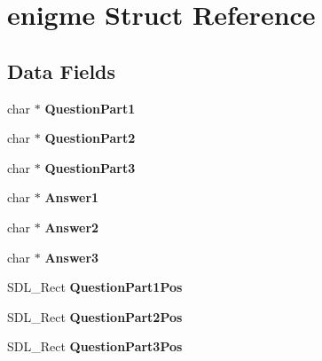 \hypertarget{structenigme}{}\section{enigme Struct Reference}
\label{structenigme}
\subsection*{Data Fields}
\begin{DoxyCompactItemize}
\item 
char $\ast$ {\bfseries Question\+Part1}\hypertarget{structenigme_aeb07dbe65787c22652fabf2f65391410}{}\label{structenigme_aeb07dbe65787c22652fabf2f65391410}

\item 
char $\ast$ {\bfseries Question\+Part2}\hypertarget{structenigme_ae9a41834f23ba4c4b781069af3e4d662}{}\label{structenigme_ae9a41834f23ba4c4b781069af3e4d662}

\item 
char $\ast$ {\bfseries Question\+Part3}\hypertarget{structenigme_a261a8372dd77f3d5a5940f09d37f48fa}{}\label{structenigme_a261a8372dd77f3d5a5940f09d37f48fa}

\item 
char $\ast$ {\bfseries Answer1}\hypertarget{structenigme_a3eb3c7d9cd0ff72dbd314c47f13360f9}{}\label{structenigme_a3eb3c7d9cd0ff72dbd314c47f13360f9}

\item 
char $\ast$ {\bfseries Answer2}\hypertarget{structenigme_a4f8e5449f4c8daa89c71a4a957b8e3be}{}\label{structenigme_a4f8e5449f4c8daa89c71a4a957b8e3be}

\item 
char $\ast$ {\bfseries Answer3}\hypertarget{structenigme_ade34f56bb419a9d94370a4c7a6bc2771}{}\label{structenigme_ade34f56bb419a9d94370a4c7a6bc2771}

\item 
S\+D\+L\+\_\+\+Rect {\bfseries Question\+Part1\+Pos}\hypertarget{structenigme_a7faaad57d25a9fc882beef9bb630ecec}{}\label{structenigme_a7faaad57d25a9fc882beef9bb630ecec}

\item 
S\+D\+L\+\_\+\+Rect {\bfseries Question\+Part2\+Pos}\hypertarget{structenigme_a86f905eac323f28d47a054f73e7c6128}{}\label{structenigme_a86f905eac323f28d47a054f73e7c6128}

\item 
S\+D\+L\+\_\+\+Rect {\bfseries Question\+Part3\+Pos}\hypertarget{structenigme_a8b50bd0912f792930b96adc6f750d3d1}{}\label{structenigme_a8b50bd0912f792930b96adc6f750d3d1}


\end{DoxyCompactItemize}
